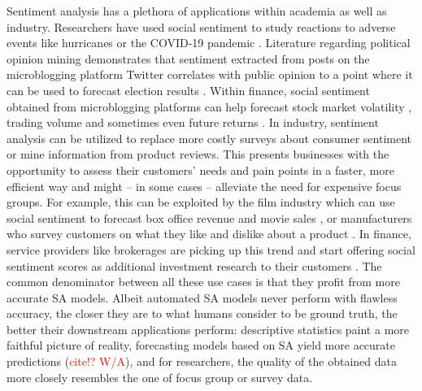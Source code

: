 Sentiment analysis has a plethora of applications within academia as well as industry. Researchers have used social sentiment to study reactions to adverse events like hurricanes  or the COVID-19 pandemic . Literature regarding political opinion mining demonstrates that sentiment extracted from posts on the microblogging platform Twitter correlates with public opinion to a point where it can be used to forecast election results .
Within finance, social sentiment obtained from microblogging platforms can help forecast stock market volatility , trading volume  and sometimes even future returns .
In industry, sentiment analysis can be utilized to replace more costly surveys about consumer sentiment or mine information from product reviews. This presents businesses with the opportunity to assess their customers' needs and pain points in a faster, more efficient way and might -- in some cases -- alleviate the need for expensive focus groups. For example, this can be exploited by the film industry which can use social sentiment to forecast box office revenue and movie sales , or manufacturers who survey customers on what they like and dislike about a product .
In finance, service providers like brokerages are picking up this trend and start offering social sentiment scores as additional investment research to their customers \cite{ibkr-sentiment}. The common denominator between all these use cases is that they profit from more accurate SA models. Albeit automated SA models never perform with flawless accuracy, the closer they are to what humans consider to be ground truth, the better their downstream applications perform: descriptive statistics paint a more faithful picture of reality, forecasting models based on SA yield more accurate predictions (\textcolor{red}{cite!? W/A}), and for researchers, the quality of the obtained data more closely resembles the one of focus group or survey data.

